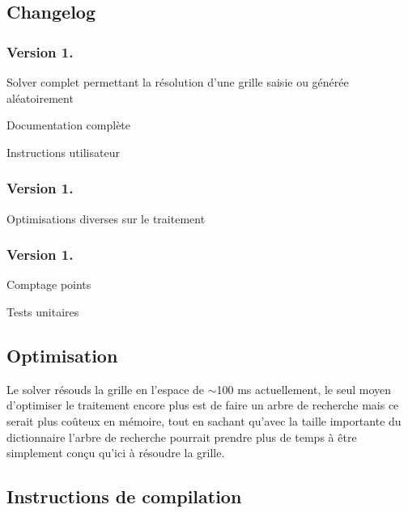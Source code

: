 \subsection*{Changelog}

\subsubsection*{Version 1.}


\begin{DoxyItemize}
\item Solver complet permettant la résolution d'une grille saisie ou générée aléatoirement
\item Documentation complète
\item Instructions utilisateur
\end{DoxyItemize}

\subsubsection*{Version 1.}


\begin{DoxyItemize}
\item Optimisations diverses sur le traitement
\end{DoxyItemize}

\subsubsection*{Version 1.}


\begin{DoxyItemize}
\item Comptage points
\item Tests unitaires
\end{DoxyItemize}

\subsection*{Optimisation}

Le solver résouds la grille en l'espace de $\sim$100 ms actuellement, le seul moyen d'optimiser le traitement encore plus est de faire un arbre de recherche mais ce serait plus coûteux en mémoire, tout en sachant qu'avec la taille importante du dictionnaire l'arbre de recherche pourrait prendre plus de temps à être simplement conçu qu'ici à résoudre la grille.

\subsection*{Instructions de compilation}

